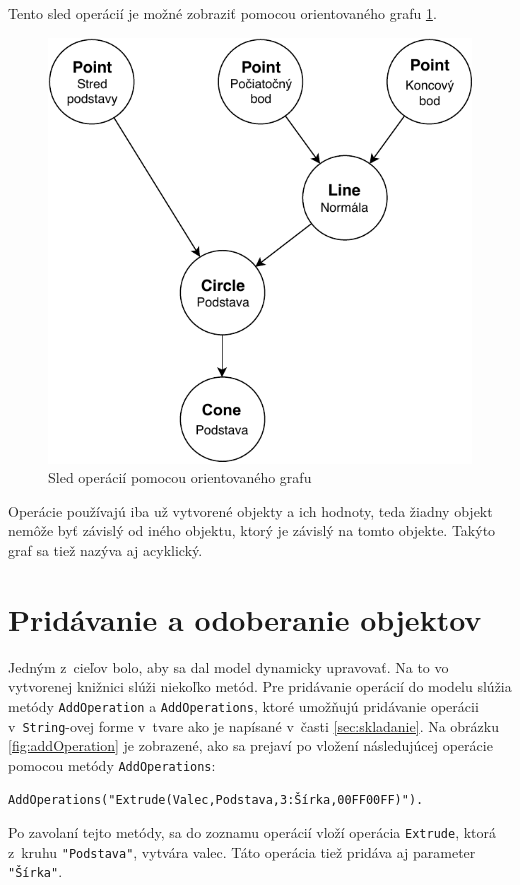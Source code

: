 Tento sled operácií je možné zobraziť pomocou orientovaného grafu \ref{fig:Sled_operácii_pomocou_orientovaného_grafu}. \nopagebreak
\begin{figure}[H]
	\centering
	\includegraphics[height=0.6\textwidth]{obrazky-figures/DP Navrh operacii-Strom.pdf}
	\caption{Sled operácií pomocou orientovaného grafu}
	\label{fig:Sled_operácii_pomocou_orientovaného_grafu}
\end{figure}


Operácie používajú iba už vytvorené objekty a ich hodnoty, teda žiadny objekt nemôže byť závislý od iného objektu, ktorý je závislý na tomto objekte. Takýto graf sa tiež nazýva aj acyklický. 
















\section{Pridávanie a odoberanie objektov}
\label{sec:addAndRemoveObjects}
Jedným z~cieľov bolo, aby sa dal model dynamicky upravovať. Na to vo vytvorenej knižnici slúži niekoľko metód. 
Pre pridávanie operácií do modelu slúžia metódy \texttt{AddOperation}  a \texttt{AddOperations}, ktoré umožňujú pridávanie operácii v~\texttt{String}-ovej forme v~tvare ako je napísané v~časti \ref{sec:skladanie}. 
Na obrázku \ref{fig:addOperation} je zobrazené, ako sa prejaví po vložení následujúcej operácie pomocou metódy \texttt{AddOperations}:
\begin{lstlisting}
AddOperations("Extrude(Valec,Podstava,3:Šírka,00FF00FF)").
\end{lstlisting}
Po zavolaní tejto metódy, sa do zoznamu operácií vloží operácia \texttt{Extrude}, ktorá z~kruhu \texttt{"Podstava"}, vytvára valec. Táto operácia tiež pridáva aj parameter \texttt{"Šírka"}.

